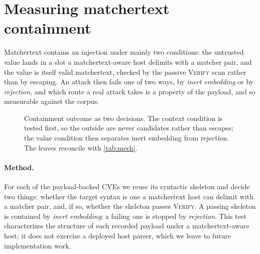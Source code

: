 \section{Measuring matchertext containment}
\label{sec:prevent}

Matchertext contains an injection under mainly two conditions: the untrusted value lands in a slot
a matchertext-aware host delimits with a matcher pair, and the value is itself
valid matchertext, checked by the passive \textsc{Verify} scan rather than by
escaping.
An attack then fails one of two ways, by \emph{inert embedding} or by
\emph{rejection}, and which route a real attack takes is a property of the
payload, and so measurable against the corpus.

\begin{figure}[t]
\footnotesize

\caption{Containment outcome as two decisions. The context condition is tested
first, so the \dataOutsideCVEs outside are never candidates rather than escapes; the value
condition then separates inert embedding from rejection. The leaves reconcile
with \cref{tab:mech}.}
\label{fig:prevent:tree}
\end{figure}

\paragraph{Method.}
For each of the \dataPayloadBackedCVEs payload-backed CVEs we reuse its syntactic skeleton and decide two things:
whether the target syntax is one a matchertext host can delimit with a matcher
pair, and, if so, whether the skeleton passes \textsc{Verify}.
A passing skeleton is contained by \emph{inert embedding}; a failing one is
stopped by \emph{rejection}.
This test characterizes the structure of each recorded payload under a
matchertext-aware host; it does not exercise a deployed host parser, which we
leave to future implementation work.

\begin{table}[t]
\centering
\small

\caption{Containment outcome by syntax over all \dataPayloadBackedCVEs payload-backed CVEs.
Contexts a matchertext host can delimit (upper block) are contained by inert
embedding or by rejection; the \emph{Outside} column counts CVEs failing a
condition of \cref{sec:threat}, either an execution sink (the HTML/DOM entries
are \texttt{javascript:} URLs) or a context whose delimiters are not matchers.}
\label{tab:mech}
\end{table}

